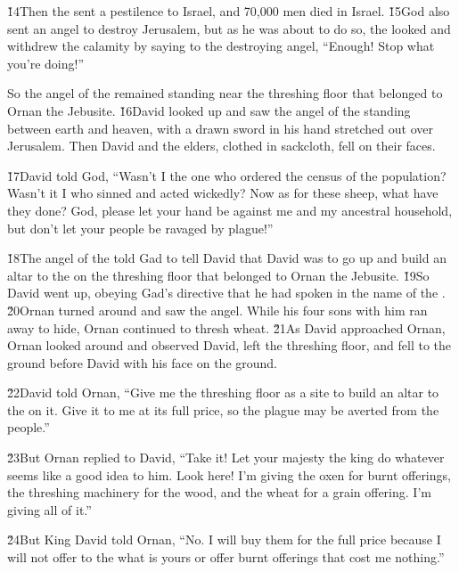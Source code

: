 \v{14}Then the  sent a pestilence to Israel, and 70,000 men died in Israel. \v{15}God also sent an angel to destroy Jerusalem, but as he was about to do so, the  looked and withdrew the calamity by saying to the destroying angel, ``Enough! Stop what you're doing!''

So the angel of the  remained standing near the threshing floor that belonged to Ornan the Jebusite. \v{16}David looked up and saw the angel of the  standing between earth and heaven, with a drawn sword in his hand stretched out over Jerusalem. Then David and the elders, clothed in sackcloth, fell on their faces.

\v{17}David told God, ``Wasn't I the one who ordered the census of the population? Wasn't it I who sinned and acted wickedly? Now as for these sheep, what have they done?  God, please let your hand be against me and my ancestral household, but don't let your people be ravaged by plague!''

\v{18}The angel of the  told Gad to tell David that David was to go up and build an altar to the  on the threshing floor that belonged to Ornan the Jebusite. \v{19}So David went up, obeying Gad's directive that he had spoken in the name of the . \v{20}Ornan turned around and saw the angel. While his four sons with him ran away to hide, Ornan continued to thresh wheat. \v{21}As David approached Ornan, Ornan looked around and observed David, left the threshing floor, and fell to the ground before David with his face on the ground.

\v{22}David told Ornan, ``Give me the threshing floor as a site to build an altar to the  on it. Give it to me at its full price, so the plague may be averted from the people.''

\v{23}But Ornan replied to David, ``Take it! Let your majesty the king do whatever seems like a good idea to him. Look here! I'm giving the oxen for burnt offerings, the threshing machinery for the wood, and the wheat for a grain offering. I'm giving all of it.''

\v{24}But King David told Ornan, ``No. I will buy them for the full price because I will not offer to the  what is yours or offer burnt offerings that cost me nothing.''

